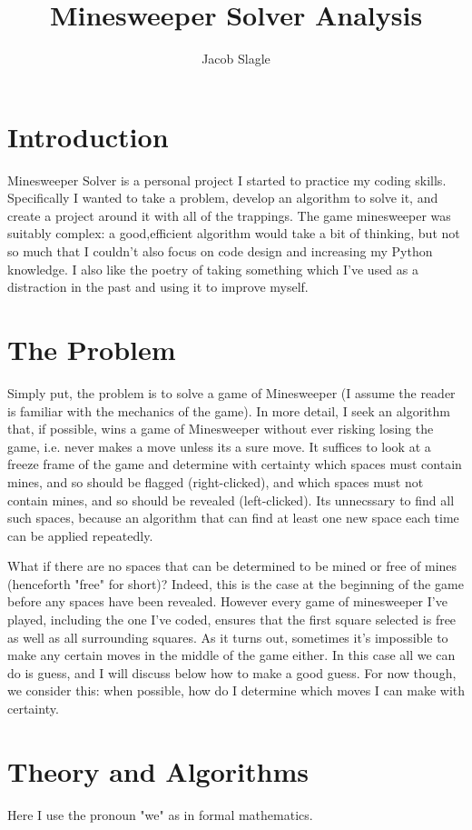 \documentclass{article}
\title{Minesweeper Solver Analysis}
\author{Jacob Slagle}
\theoremstyle{definition}
\theoremstyle{definition}
\theoremstyle{theorem}
\begin{document}
	\maketitle
	
	\section*{Introduction}
	Minesweeper Solver is a personal project I started to practice my coding skills. Specifically I wanted to take a problem, develop an algorithm to solve it, and create a project around it with all of the trappings. The game minesweeper was suitably complex: a good,efficient algorithm would take a bit of thinking, but not so much that I couldn't also focus on code design and increasing my Python knowledge. I also like the poetry of taking something which I've used as a distraction in the past and using it to improve myself.
	
	\section*{The Problem}
	Simply put, the problem is to solve a game of Minesweeper (I assume the reader is familiar with the mechanics of the game). In more detail, I seek an algorithm that, if possible, wins a game of Minesweeper without ever risking losing the game, i.e. never makes a move unless its a sure move. It suffices to look at a freeze frame of the game and determine with certainty which spaces must contain mines, and so should be flagged (right-clicked), and which spaces must not contain mines, and so should be revealed (left-clicked). Its unnecssary to find all such spaces, because an algorithm that can find at least one new space each time can be applied repeatedly.
	
	What if there are no spaces that can be determined to be mined or free of mines (henceforth "free" for short)? Indeed, this is the case at the beginning of the game before any spaces have been revealed. However every game of minesweeper I've played, including the one I've coded, ensures that the first square selected is free as well as all surrounding squares. As it turns out, sometimes it's impossible to make any certain moves in the middle of the game either. In this case all we can do is guess, and I will discuss below how to make a good guess. For now though, we consider this: when possible, how do I determine which moves I can make with certainty.
	
	\section*{Theory and Algorithms}
	Here I use the pronoun "we" as in formal mathematics.
	
\end{document}
